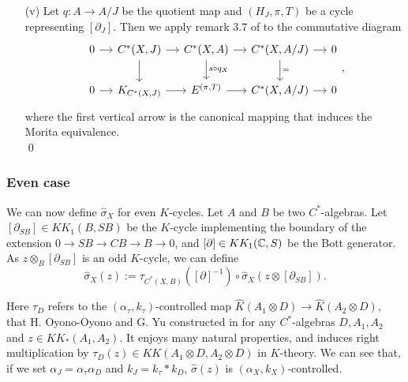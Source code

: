 \begin{dem}
\begin{enumerate}
\item[(v)] Let $q:A\rightarrow A/J$ be the quotient map and $(H_J, \pi, T)$ be a cycle representing $[\partial_J]$. Then we apply remark $3.7$ of \cite{OY2} to the commutative diagram
\[\begin{tikzcd}[column sep = small]
0\arrow{r} & C^*(X,J)\arrow{r}\arrow{d} & C^*(X,A) \arrow{r}\arrow{d}{s\circ q_X}& C^*(X,A/J)\arrow{r}\arrow{d}{=} & 0\\
0\arrow{r} & K_{C^*(X,J)}\arrow{r} & E^{(\pi,T)} \arrow{r}& C^*(X,A/J)\arrow{r} & 0
\end{tikzcd},\]
where the first vertical arrow is the canonical mapping that induces the Morita equivalence. \\
\qed
\end{enumerate}
\end{dem}

\subsubsection{Even case}

We can now define $\hat\sigma_X$ for even $K$-cycles. Let $A$ and $B$ be two $C^*$-algebras. Let $[\partial_{SB}]\in KK_1(B,SB)$ be the $K$-cycle implementing the boundary of the extension $0\rightarrow SB\rightarrow CB\rightarrow B\rightarrow 0$, and $[\partial]\in KK_1(\mathbb C,S)$ be the Bott generator. As $z\otimes_B [\partial_{SB}]$ is an odd $K$-cycle, we can define
\[\hat\sigma_X(z):= \tau_{C^*(X,B)}([\partial]^{-1})\circ \hat\sigma_X(z\otimes[\partial_{SB}]).\] 

Here $\tau_D$ refers to the $(\alpha_\tau,k_\tau)$-controlled map $\hat K (A_1\otimes D )\rightarrow \hat K(A_2\otimes D)$, that H. Oyono-Oyono and G. Yu constructed in \cite{OY2} for any $C^*$-algebras $D,A_1,A_2$ and $z\in KK_*(A_1,A_2)$. It enjoys many natural properties, and induces right multiplication by $\tau_D(z)\in KK(A_1\otimes D,A_2\otimes D)$ in $K$-theory. We can see that, if we set $\alpha_J=\alpha_\tau \alpha_D$ and $k_J=k_\tau * k_D$, $\hat\sigma(z)$ is $(\alpha_X,k_X)$-controlled.\\

